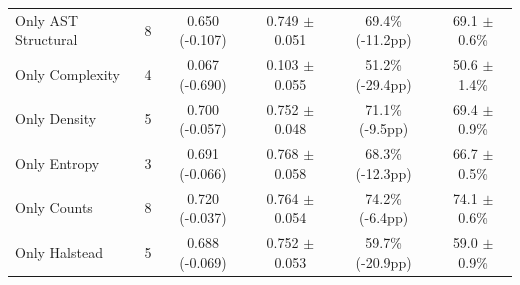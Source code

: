 \begin{table}[t]
\begin{tabular}{lc|cc|cc}
\midrule
\quad Only AST Structural & 8 & 0.650 (-0.107) & 0.749 $\pm$ 0.051 & 69.4\% (-11.2pp) & 69.1 $\pm$ 0.6\% \\
\quad Only Complexity & 4 & 0.067 (-0.690) & 0.103 $\pm$ 0.055 & 51.2\% (-29.4pp) & 50.6 $\pm$ 1.4\% \\
\quad Only Density & 5 & 0.700 (-0.057) & 0.752 $\pm$ 0.048 & 71.1\% (-9.5pp) & 69.4 $\pm$ 0.9\% \\
\quad Only Entropy & 3 & 0.691 (-0.066) & 0.768 $\pm$ 0.058 & 68.3\% (-12.3pp) & 66.7 $\pm$ 0.5\% \\
\quad Only Counts & 8 & 0.720 (-0.037) & 0.764 $\pm$ 0.054 & 74.2\% (-6.4pp) & 74.1 $\pm$ 0.6\% \\
\quad Only Halstead & 5 & 0.688 (-0.069) & 0.752 $\pm$ 0.053 & 59.7\% (-20.9pp) & 59.0 $\pm$ 0.9\% \\
\bottomrule
\end{tabular}
\end{table}
